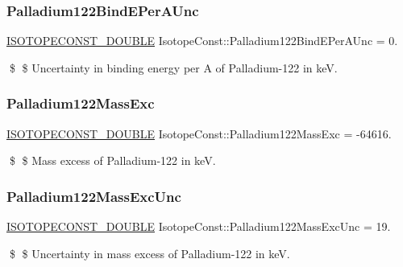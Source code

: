 \subsubsection{\texorpdfstring{Palladium122\+Bind\+E\+Per\+A\+Unc}{Palladium122BindEPerAUnc}}
{\footnotesize\ttfamily \mbox{\hyperlink{group___isotope_const-_macros_ga8f45a7272ce02c0b4c65c44636ed719a}{I\+S\+O\+T\+O\+P\+E\+C\+O\+N\+S\+T\+\_\+\+D\+O\+U\+B\+LE}} Isotope\+Const\+::\+Palladium122\+Bind\+E\+Per\+A\+Unc = 0.}

\$ \$ Uncertainty in binding energy per A of Palladium-\/122 in keV. \mbox{\label{group___isotope_const-_palladium-_pd122_ga6dd92d8a7108109f6b95e90af75a8eb0}} 
\subsubsection{\texorpdfstring{Palladium122\+Mass\+Exc}{Palladium122MassExc}}
{\footnotesize\ttfamily \mbox{\hyperlink{group___isotope_const-_macros_ga8f45a7272ce02c0b4c65c44636ed719a}{I\+S\+O\+T\+O\+P\+E\+C\+O\+N\+S\+T\+\_\+\+D\+O\+U\+B\+LE}} Isotope\+Const\+::\+Palladium122\+Mass\+Exc = -\/64616.}

\$ \$ Mass excess of Palladium-\/122 in keV. \mbox{\label{group___isotope_const-_palladium-_pd122_gaf87906fa5671f7d7909d2ced56e21cc5}} 
\subsubsection{\texorpdfstring{Palladium122\+Mass\+Exc\+Unc}{Palladium122MassExcUnc}}
{\footnotesize\ttfamily \mbox{\hyperlink{group___isotope_const-_macros_ga8f45a7272ce02c0b4c65c44636ed719a}{I\+S\+O\+T\+O\+P\+E\+C\+O\+N\+S\+T\+\_\+\+D\+O\+U\+B\+LE}} Isotope\+Const\+::\+Palladium122\+Mass\+Exc\+Unc = 19.}

\$ \$ Uncertainty in mass excess of Palladium-\/122 in keV. \mbox{\label{group___isotope_const-_palladium-_pd122_ga5332252686bb7505a5f0a98d0f99396d}} 
